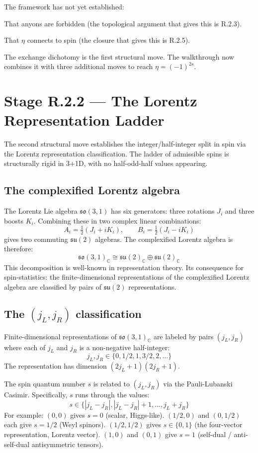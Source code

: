 \documentclass[11pt,a4paper]{article}
\begin{document}
The framework has not yet established:

That anyons are forbidden (the topological argument that gives this is R.2.3).

That $\eta$ connects to spin (the closure that gives this is R.2.5).

The exchange dichotomy is the first structural move. The walkthrough now combines it with three additional moves to reach $\eta = (-1)^{2s}$.

\section{Stage R.2.2 --- The Lorentz Representation Ladder}

The second structural move establishes the integer/half-integer split in spin via the Lorentz representation classification. The ladder of admissible spins is structurally rigid in 3+1D, with no half-odd-half values appearing.

\subsection{The complexified Lorentz algebra}

The Lorentz Lie algebra $\mathfrak{so}(3,1)$ has six generators: three rotations $J_i$ and three boosts $K_i$. Combining these in two complex linear combinations:
\[
A_i = \tfrac{1}{2}(J_i + iK_i), \qquad B_i = \tfrac{1}{2}(J_i - iK_i)
\]
gives two commuting $\mathfrak{su}(2)$ algebras. The complexified Lorentz algebra is therefore:
\[
\mathfrak{so}(3,1)_\mathbb{C} \cong \mathfrak{su}(2)_\mathbb{C} \oplus \mathfrak{su}(2)_\mathbb{C}
\]
This decomposition is well-known in representation theory. Its consequence for spin-statistics: the finite-dimensional representations of the complexified Lorentz algebra are classified by pairs of $\mathfrak{su}(2)$ representations.

\subsection{The $(j_L, j_R)$ classification}

Finite-dimensional representations of $\mathfrak{so}(3,1)_\mathbb{C}$ are labeled by pairs $(j_L, j_R)$ where each of $j_L$ and $j_R$ is a non-negative half-integer:
\[
j_L, j_R \in \{0, 1/2, 1, 3/2, 2, \ldots\}
\]
The representation has dimension $(2j_L + 1)(2j_R + 1)$.

The spin quantum number $s$ is related to $(j_L, j_R)$ via the Pauli-Lubanski Casimir. Specifically, $s$ runs through the values:
\[
s \in \{|j_L - j_R|, |j_L - j_R| + 1, \ldots, j_L + j_R\}
\]
For example: $(0, 0)$ gives $s = 0$ (scalar, Higgs-like). $(1/2, 0)$ and $(0, 1/2)$ each give $s = 1/2$ (Weyl spinors). $(1/2, 1/2)$ gives $s \in \{0, 1\}$ (the four-vector representation, Lorentz vector). $(1, 0)$ and $(0, 1)$ give $s = 1$ (self-dual / anti-self-dual antisymmetric tensors).
\end{document}
